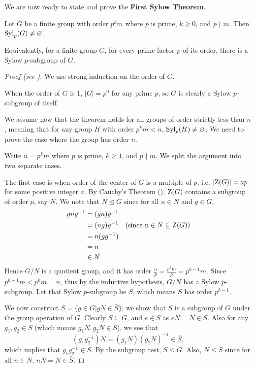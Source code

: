 We are now ready to state and prove the \textbf{First Sylow Theorem}.
\begin{theorem}[Sylow I]\label{thrm-sylow-1}
    Let $G$ be a finite group with order $p^k m$ where $p$ is prime, $k \geq 0$, and $p \nmid m$. Then $\mathrm{Syl}_{p}(G) \neq \varnothing$.
\end{theorem}
\begin{remark}
    Equivalently, for a finite group $G$, for every prime factor $p$ of its order, there is a Sylow $p$-subgroup of $G$.
\end{remark}
\begin{proof}[Proof (see {\cite[pp.~1--3]{mann_2011}})]
    We use strong induction on the order of $G$.

    When the order of $G$ is 1, $|G| = p^0$ for any prime $p$, so $G$ is clearly a Sylow $p$-subgroup of itself.

    We assume now that the theorem holds for all groups of order strictly less than $n$, meaning that for any group $H$ with order $p^k m < n$, $\mathrm{Syl}_{p}(H) \neq \varnothing$. We need to prove the case where the group has order $n$.
    
    Write $n = p^k m$ where $p$ is prime, $k \geq 1$, and $p \nmid m$. We split the argument into two separate cases.

    The first case is when order of the center of $G$ is a multiple of $p$, i.e. $|\mathrm{Z}(G)| = ap$ for some positive integer $a$. By Cauchy's Theorem (), $\mathrm{Z}(G)$ contains a subgroup of order $p$, say $N$. We note that $N \unlhd G$ since for all $n \in N$ and $g \in G$,
    \begin{align*}
        gng^{-1} &= (gn)g^{-1}\\
        &= (ng)g^{-1} & (\text{since n} \in N \subseteq \mathrm{Z}(G))\\
        &= n(gg^{-1})\\
        &= n\\
        &\in N
    \end{align*}
    Hence $G/N$ is a quotient group, and it has order $\frac np = \frac{p^km}{p} = p^{k-1}m$. Since $p^{k-1}m < p^km = n$, thus by the inductive hypothesis, $G/N$ has a Sylow $p$-subgroup. Let that Sylow $p$-subgroup be $\bar{S}$, which means $\bar{S}$ has order $p^{k-1}$.

    We now construct $S = \{g \in G \vert gN \in \bar{S}\}$; we show that $S$ is a subgroup of $G$ under the group operation of $G$. Clearly $S \subseteq G$, and $e \in S$ as $eN = N \in \bar{S}$. Also for any $g_1, g_2 \in S$ (which means $g_1N, g_2N \in \bar{S}$), we see that
    \[
        (g_1g_2^{-1})N = (g_1N)(g_2N)^{-1} \in \bar{S},
    \]
    which implies that $g_1g_2^{-1} \in S$. By the subgroup test, $S \leq G$. Also, $N \leq S$ since for all $n \in N$, $nN = N \in \bar{S}$.


\end{proof}

